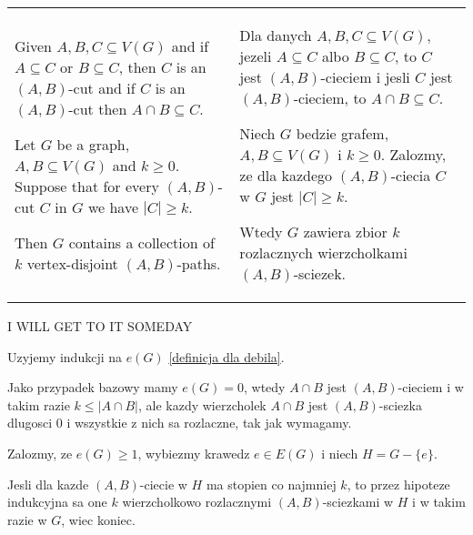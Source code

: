 \begin{tabularx}{\textwidth}{ X!{\color{git90gray}\vrule} X}

    Given $A,B,C\subseteq V(G)$ and if $A\subseteq C$ or $B\subseteq C$, then $C$ is an $(A,B)$-cut and if $C$ is an $(A,B)$-cut then $A\cap B\subseteq C$.
    \bigskip

    Let $G$ be a graph, $A,B\subseteq V(G)$ and $k\geq0$. Suppose that for every $(A,B)$-cut $C$ in $G$ we have $|C|\geq k$. 

    Then $G$ contains a {\color{acc}collection of $k$ vertex-disjoint} $(A,B)$-paths.

    &

    Dla danych $A,B,C\subseteq V(G)$, jezeli $A\subseteq C$ albo $B\subseteq C$, to $C$ jest $(A,B)$-cieciem i jesli $C$ jest $(A,B)$-cieciem, to $A\cap B\subseteq C$.
    \bigskip

    Niech $G$ bedzie grafem, $A,B\subseteq V(G)$ i $k\geq0$. Zalozmy, ze dla kazdego $(A,B)$-ciecia $C$ w $G$ jest $|C|\geq k$.

    Wtedy $G$ zawiera {\color{acc}zbior $k$ rozlacznych wierzcholkami} $(A,B)$-sciezek.

\end{tabularx}

\medskip

\medskip

{\color{cyan}I WILL GET TO IT SOMEDAY}

\medskip


Uzyjemy indukcji na $e(G)$ \hyperref[handshaking-lemma]{[definicja dla debila]}.
\smallskip

Jako przypadek bazowy mamy $e(G)=0$, wtedy $A\cap B$ jest $(A,B)$-cieciem i w takim razie $k\leq |A\cap B|$, ale kazdy wierzcholek $A\cap B$ jest $(A,B)$-sciezka dlugosci 0 i wszystkie z nich sa rozlaczne, tak jak wymagamy.
\medskip

Zalozmy, ze $e(G)\geq 1$, wybiezmy krawedz $e\in E(G)$ i niech $H=G-\{e\}$. 
\smallskip

Jesli dla kazde $(A,B)$-ciecie w $H$ ma stopien co najmniej $k$, to przez hipoteze indukcyjna sa one $k$ wierzcholkowo rozlacznymi $(A,B)$-sciezkami w $H$ i w takim razie w $G$, wiec koniec.
\smallskip

